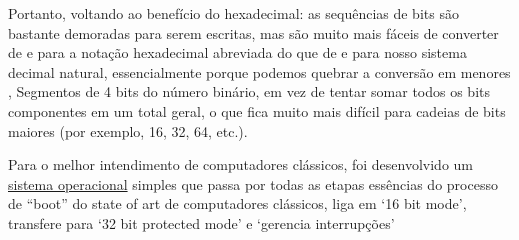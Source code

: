 Portanto, voltando ao benefício do hexadecimal: as sequências de bits são bastante demoradas para serem escritas, mas são muito mais fáceis de converter de e para a notação hexadecimal abreviada do que de e para nosso sistema decimal natural, essencialmente porque podemos quebrar a conversão em menores , Segmentos de 4 bits do número binário, em vez de tentar somar todos os bits componentes em um total geral, o que fica muito mais difícil para cadeias de bits maiores (por exemplo, 16, 32, 64, etc.).



Para o melhor intendimento de computadores clássicos, foi desenvolvido um \href{https://github.com/gzsig/zsig-OS}{sistema operacional} simples que passa por todas as etapas essências do processo de ``boot'' do state of art de computadores clássicos, liga em `16 bit mode', transfere para `32 bit protected mode' e `gerencia interrupções'
\newpage
